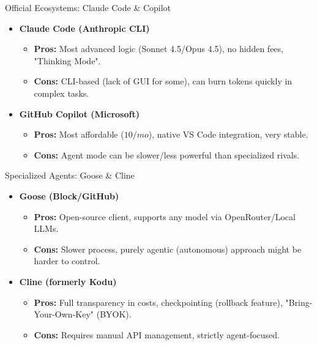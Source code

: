 \documentclass[aspectratio=169]{beamer}
\begin{document}
\begin{frame}[t]{Official Ecosystems: Claude Code \& Copilot}
    \begin{itemize}
        \item \textbf{Claude Code (Anthropic CLI)}
        \begin{itemize}
            \item \textbf{Pros:} Most advanced logic (Sonnet 4.5/Opus 4.5), no hidden fees, "Thinking Mode".
            \item \textbf{Cons:} CLI-based (lack of GUI for some), can burn tokens quickly in complex tasks.
        \end{itemize}
        \item \textbf{GitHub Copilot (Microsoft)}
        \begin{itemize}
            \item \textbf{Pros:} Most affordable ($10/mo$), native VS Code integration, very stable.
            \item \textbf{Cons:} Agent mode can be slower/less powerful than specialized rivals.
        \end{itemize}
    \end{itemize}
\end{frame}

\begin{frame}[t]{Specialized Agents: Goose \& Cline}
    \begin{itemize}
        \item \textbf{Goose (Block/GitHub)}
        \begin{itemize}
            \item \textbf{Pros:} Open-source client, supports any model via OpenRouter/Local LLMs.
            \item \textbf{Cons:} Slower process, purely agentic (autonomous) approach might be harder to control.
        \end{itemize}
        \item \textbf{Cline (formerly Kodu)}
        \begin{itemize}
            \item \textbf{Pros:} Full transparency in costs, checkpointing (rollback feature), "Bring-Your-Own-Key" (BYOK).
            \item \textbf{Cons:} Requires manual API management, strictly agent-focused.
        \end{itemize}
    \end{itemize}
\end{frame}
\end{document}
